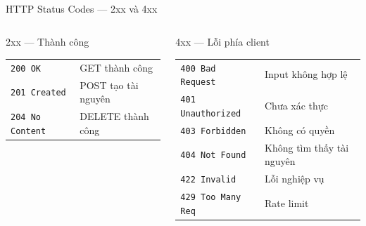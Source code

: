 \documentclass[aspectratio=169,10pt]{beamer}
\newcommand{\sref}[1]{\textsuperscript{\scriptsize\cite{#1}}}
\begin{document}
\begin{frame}{HTTP Status Codes --- 2xx và 4xx\sref{rfc9110}}
  \begin{columns}[T]
    \begin{block}{2xx --- Thành công}
      \small
      \begin{tabular}{p{2.1cm}p{3.25cm}}
        \texttt{200 OK} & GET thành công \\
        \texttt{201 Created} & POST tạo tài nguyên \\
        \texttt{204 No Content} & DELETE thành công \\
      \end{tabular}
    \end{block}

    \begin{block}{4xx --- Lỗi phía client}
      \small
      \begin{tabular}{p{2.35cm}p{3.0cm}}
        \texttt{400 Bad Request} & Input không hợp lệ \\
        \texttt{401 Unauthorized} & Chưa xác thực \\
        \texttt{403 Forbidden} & Không có quyền \\
        \texttt{404 Not Found} & Không tìm thấy tài nguyên \\
        \texttt{422 Invalid} & Lỗi nghiệp vụ \\
        \texttt{429 Too Many Req} & Rate limit \\
      \end{tabular}
    \end{block}
  \end{columns}
\end{frame}
\end{document}
